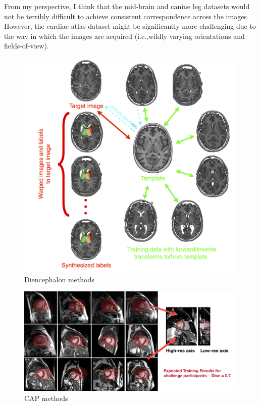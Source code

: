 \documentclass{llncs}
\begin{document}
From my perspective, I think that the mid-brain and canine leg datasets would not be terribly difficult to achieve consistent correspondence across the images. However, the cardiac atlas dataset might be significantly more challenging due to the way in which the images are acquired (i.e.,wildly varying orientations and fields-of-view).

\begin{figure}[t]
 \centering 
  \includegraphics[width=5in]{../figs/SATA_diencephalon.png}
 \caption{Diencephalon methods}
 \label{fig:DIEmethods}
\end{figure}

\begin{figure}[t]
 \centering 
  \includegraphics[width=5in]{../figs/CAP_methods.pdf}
 \caption{CAP methods}
 \label{fig:CAPmethods}
\end{figure}
\end{document}
